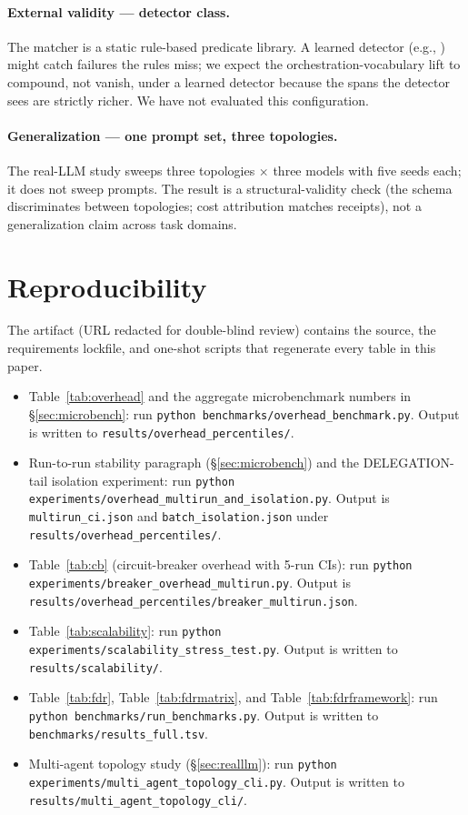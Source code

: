 \documentclass[sigplan,10pt,anonymous,review]{acmart}
\begin{document}
\paragraph{External validity --- detector class.} The matcher is a
static rule-based predicate library. A learned detector (e.g.,
\cite{agentdebug,aegis}) might catch failures the rules miss; we
expect the orchestration-vocabulary lift to compound, not vanish,
under a learned detector because the spans the detector sees are
strictly richer. We have not evaluated this configuration.

\paragraph{Generalization --- one prompt set, three topologies.} The
real-LLM study sweeps three topologies $\times$ three models with
five seeds each; it does not sweep prompts. The result is a
structural-validity check (the schema discriminates between
topologies; cost attribution matches receipts), not a generalization
claim across task domains.

\section{Reproducibility}
\label{sec:repro}

The artifact (URL redacted for double-blind review) contains the
source, the requirements lockfile, and one-shot scripts that
regenerate every table in this paper.

\begin{itemize}
\item Table~\ref{tab:overhead} and the aggregate microbenchmark
numbers in \S\ref{sec:microbench}: run
\texttt{python benchmarks/overhead\_benchmark.py}. Output is written
to \texttt{results/overhead\_percentiles/}.
\item Run-to-run stability paragraph (\S\ref{sec:microbench}) and the
DELEGATION-tail isolation experiment: run
\texttt{python experiments/overhead\_multirun\_and\_isolation.py}.
Output is \texttt{multirun\_ci.json} and \texttt{batch\_isolation.json}
under \texttt{results/overhead\_percentiles/}.
\item Table~\ref{tab:cb} (circuit-breaker overhead with 5-run CIs):
run \texttt{python experiments/breaker\_overhead\_multirun.py}.
Output is \texttt{results/overhead\_percentiles/breaker\_multirun.json}.
\item Table~\ref{tab:scalability}: run
\texttt{python experiments/scalability\_stress\_test.py}. Output is
written to \texttt{results/scalability/}.
\item Table~\ref{tab:fdr}, Table~\ref{tab:fdrmatrix}, and
Table~\ref{tab:fdrframework}: run
\texttt{python benchmarks/run\_benchmarks.py}. Output is written to
\texttt{benchmarks/results\_full.tsv}.
\item Multi-agent topology study (\S\ref{sec:realllm}): run
\texttt{python experiments/multi\_agent\_topology\_cli.py}. Output is
written to \texttt{results/multi\_agent\_topology\_cli/}.
\end{itemize}
\end{document}
